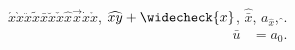 \documentclass{article}
\begin{document}
$\acute{x}\grave{x}\ddot{x}\tilde{x}\bar{x}\breve{x}\check{x}\hat{x}\vec{x}\dot{x}\mathring{x}$,
$\widehat{xy}+\widecheck{x}$, $\hat{\bar{x}}$, $a_{\hat{x}}$, $\hat{}$.
\begin{align}
\bar{u} &= a_0.
\end{align}
\end{document}
